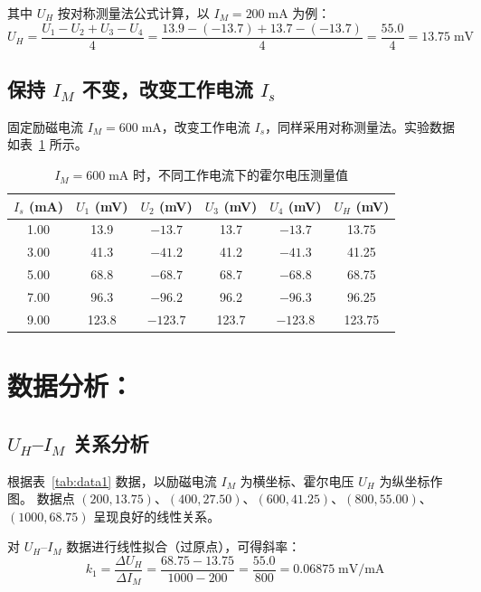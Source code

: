 \noindent 其中 $U_H$ 按对称测量法公式计算，以 $I_M = 200\;\text{mA}$ 为例：
\begin{equation}
    U_H = \frac{U_1 - U_2 + U_3 - U_4}{4} = \frac{13.9 - (-13.7) + 13.7 - (-13.7)}{4} = \frac{55.0}{4} = 13.75\;\text{mV}
\end{equation}

\subsection{保持 $I_M$ 不变，改变工作电流 $I_s$}

固定励磁电流 $I_M = 600\;\text{mA}$，改变工作电流 $I_s$，同样采用对称测量法。实验数据如表~\ref{tab:data2} 所示。

\begin{table}[htbp]
    \centering
    \caption{$I_M = 600\;\text{mA}$ 时，不同工作电流下的霍尔电压测量值}
    \label{tab:data2}
    \begin{tabular}{cccccc}
        \hline
        $I_s$ (mA) & $U_1$ (mV) & $U_2$ (mV) & $U_3$ (mV) & $U_4$ (mV) & $U_H$ (mV) \\
        \hline
        1.00 &  13.9  & $-13.7$ &  13.7  & $-13.7$ & 13.75 \\
        3.00 &  41.3  & $-41.2$ &  41.2  & $-41.3$ & 41.25 \\
        5.00 &  68.8  & $-68.7$ &  68.7  & $-68.8$ & 68.75 \\
        7.00 &  96.3  & $-96.2$ &  96.2  & $-96.3$ & 96.25 \\
        9.00 & 123.8  & $-123.7$& 123.7  & $-123.8$& 123.75 \\
        \hline
    \end{tabular}
\end{table}

\section{数据分析：}

\subsection{$U_H$--$I_M$ 关系分析}

根据表~\ref{tab:data1} 数据，以励磁电流 $I_M$ 为横坐标、霍尔电压 $U_H$ 为纵坐标作图。
数据点 $(200, 13.75)$、$(400, 27.50)$、$(600, 41.25)$、$(800, 55.00)$、$(1000, 68.75)$ 呈现良好的线性关系。

对 $U_H$--$I_M$ 数据进行线性拟合（过原点），可得斜率：
\begin{equation}
    k_1 = \frac{\Delta U_H}{\Delta I_M} = \frac{68.75 - 13.75}{1000 - 200} = \frac{55.0}{800} = 0.06875\;\text{mV/mA}
\end{equation}

